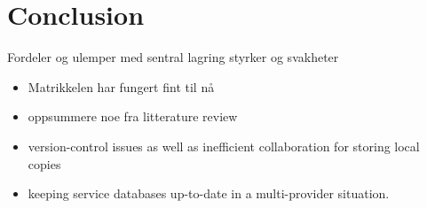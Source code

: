 \chapter{Conclusion}

Fordeler og ulemper med sentral lagring styrker og svakheter


\begin{itemize}
	\item Matrikkelen har fungert fint til nå
	\item oppsummere noe fra litterature review
	\item version-control issues as well as inefficient collaboration for storing local copies
	\item keeping service databases up-to-date in a multi-provider situation. %
	
\end{itemize}









